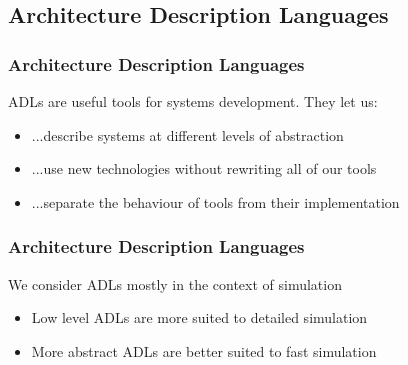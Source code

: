 \subsection{Architecture Description Languages}

\begin{frame}
\frametitle{Architecture Description Languages}

ADLs are useful tools for systems development. They let us:
\begin{itemize}
	\item<2-> ...describe systems at different levels of abstraction
	\item<3-> ...use new technologies without rewriting all of our tools
	\item<4-> ...separate the behaviour of tools from their implementation
\end{itemize}

\end{frame}

\begin{frame}
\frametitle{Architecture Description Languages}

We consider ADLs mostly in the context of simulation
\begin{itemize}
	\item Low level ADLs are more suited to detailed simulation
	\item More abstract ADLs are better suited to fast simulation
\end{itemize}

\end{frame}
